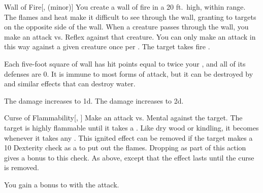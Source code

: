 \lowercase{\hypertarget{spell:Wall of Fire}{}}\label{spell:Wall of Fire}
\begin{freeability}[Rank 4]{\hypertarget{spell:Wall of Fire}{Wall of Fire}}[,  (minor)]
You create a wall of fire in a 20 ft.\ high, \arealarge {} within \rngmed range.
The flames and heat make it difficult to see through the wall, granting  to targets on the opposite side of the wall.
When a creature passes through the wall, you make an attack vs. Reflex against that creature.
You can only make an attack in this way against a given creature once per .
\hit The target takes fire .

Each five-foot square of wall has hit points equal to twice your , and all of its defenses are 0.
It is immune to most forms of attack, but it can be destroyed by  and similar effects that can destroy water.

\rankline
{} The damage increases to  \plus1d.
 The damage increases to  \plus2d.
\end{freeability}
\vspace{0.25em}



\lowercase{\hypertarget{spell:Curse of Flammability}{}}\label{spell:Curse of Flammability}
\begin{freeability}[Rank 5]{\hypertarget{spell:Curse of Flammability}{Curse of Flammability}}[, ]
Make an attack vs. Mental against the target.
\hit The target is highly flammable until it takes a .
Like dry wood or kindling, it becomes  whenever it takes any .
This ignited effect can be removed if the target makes a  10 Dexterity check as a  to put out the flames.
Dropping  as part of this action gives a  bonus to this check.
\crit As above, except that the effect lasts until the curse is removed.

\rankline
{} You gain a  bonus to  with the attack.
\end{freeability}
\vspace{0.25em}



